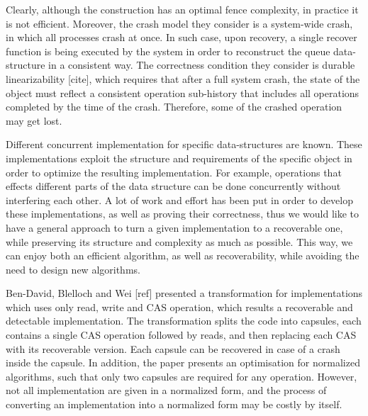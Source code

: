 Clearly, although the construction has an optimal fence complexity, in practice it is not efficient. Moreover, the crash model they consider is a system-wide crash, in which all processes crash at once. In such case, upon recovery, a single recover function is being executed by the system in order to reconstruct the queue data-structure in a consistent way. The correctness condition they consider is durable linearizability [cite], which requires that after a full system crash, the state of the object must reﬂect a consistent operation sub-history that includes all operations completed by the time of the crash. Therefore, some of the crashed operation may get lost.

Different concurrent implementation for specific data-structures are known. These implementations exploit the structure and requirements of the specific object in order to optimize the resulting implementation. For example, operations that effects different parts of the data structure can be done concurrently without interfering each other. A lot of work and effort has been put in order to develop these implementations, as well as proving their correctness, thus we would like to have a general approach to turn a given implementation to a recoverable one, while preserving its structure and complexity as much as possible. This way, we can enjoy both an efficient algorithm, as well as recoverability, while avoiding the need to design new algorithms.

Ben-David, Blelloch and Wei [ref] presented a transformation for implementations which uses only read, write and CAS operation, which results a recoverable and detectable implementation. The transformation splits the code into capsules, each contains a single CAS operation followed by reads, and then replacing each CAS with its recoverable version. Each capsule can be recovered in case of a crash inside the capsule. In addition, the paper presents an optimisation for normalized algorithms, such that only two capsules are required for any operation. However, not all implementation are given in a normalized form, and the process of converting an implementation into a normalized form may be costly by itself.

